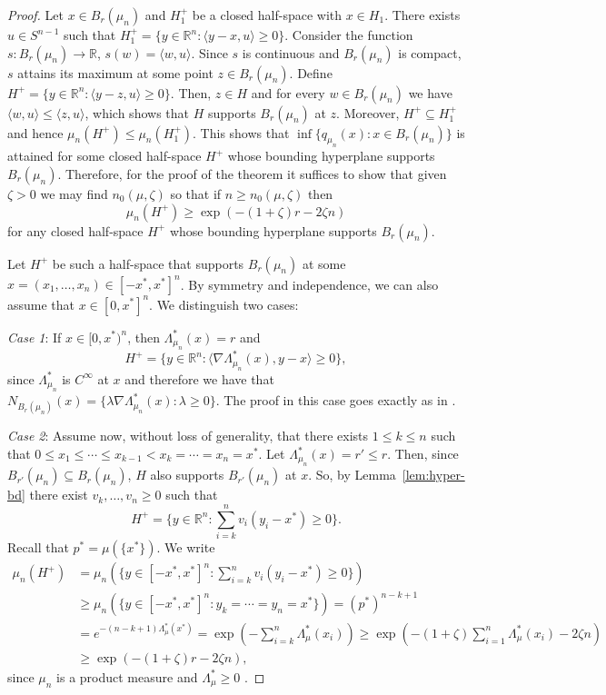 \documentclass[11pt,a4paper]{article} %
\theoremstyle{definition}
\theoremstyle{remark}
\newcommand{\1}{\mathds{1}}
\newcommand{\ls}{\le}
\newcommand{\gr}{\ge}
\begin{document}
\begin{proof}
Let $x\in B_r(\mu_n)$ and $H_1^+$ be a closed half-space with $x\in H_1$. There exists
$u\in {S^{n-1}}$ such that $H_1^+=\{y\in {\mathbb R}^n:\langle y-x,u\rangle\gr 0\}$. Consider
the function $s:B_r(\mu_n)\to {\mathbb R}$, $s(w)=\langle w, u\rangle$. Since $s$ is continuous and
$B_r(\mu_n)$ is compact, $s$ attains its maximum at some point $z\in B_r(\mu_n)$. Define
$H^+=\{y\in {\mathbb R}^n:\langle y-z,u\rangle\gr 0\}$. Then, $z\in H$ and
for every $w\in B_r(\mu_n)$ we have $\langle w,u\rangle\ls \langle z,u\rangle $, which shows that
$H$ supports $B_r(\mu_n)$ at $z$. Moreover, $H^+\subseteq H_1^+$ and hence
$\mu_n(H^+)\ls \mu_n (H_1^+)$. This shows that $\inf\{q_{\mu_n}(x):x\in B_r(\mu_n)\}$ is attained
for some closed half-space $H^+$ whose bounding hyperplane supports $B_r(\mu_n )$.
Therefore, for the proof of the theorem it suffices to show that given $\zeta >0$ we may find
$n_0(\mu,\zeta )$ so that if $n\gr n_0(\mu,\zeta)$ then
\begin{equation}\label{eq:main}\mu_n(H^+)\gr \exp (-(1+\zeta)r-2\zeta n)\end{equation}
for any closed half-space $H^+$ whose bounding hyperplane supports
$B_r(\mu_n )$.

Let $H^+$ be such a half-space that supports $B_r(\mu_n)$ at some $x=(x_1,\ldots,x_n) \in [-x^{\ast},x^{\ast}]^n$. By symmetry and independence, we can also assume that $x
\in [0,x^{\ast}]^n$. We distinguish two cases:

\noindent \textit{Case 1}: If $x \in [0,x^{\ast})^n$, then $\Lambda_{\mu_n}^{\ast}(x)=r $ and $$H^+=\{ y \in \mathbb{R}^n: \langle \nabla \Lambda_{\mu_n}^\ast(x), y-x \rangle \geq 0 \},$$ since $\Lambda_{\mu_n}^\ast$ is $C^{\infty}$ at $x$ and therefore we have that $N_{B_r(\mu_n )}(x)=\{ \lambda \nabla \Lambda_{\mu_n}^\ast(x): \lambda \geq 0 \}$. The proof in this case goes exactly as in \cite[Theorem 3.3]{Paf}.

\noindent \textit{Case 2}: Assume now, without loss of generality, that there exists $1 \leq k \leq n $ such that $0 \leq x_1 \leq \cdots \leq x_{k-1}<x_k=\cdots=x_n=x^\ast$. Let  $\Lambda_{\mu_n}^\ast(x)=r' \leq r$. Then, since $B_{r'}(\mu_n) \subseteq B_r(\mu_n)$, $H$ also supports $B_{r'}(\mu_n)$ at $x$. So, by Lemma~\ref{lem:hyper-bd} there exist $v_k,\ldots,v_n \geq 0$ such that $$H^+=\{y \in \mathbb{R}^n: \sum\limits_{i=k}^{n}v_i(y_i-x^\ast) \geq 0\}.$$ Recall that $p^\ast=\mu(\{x^\ast\})$. We write 
\begin{align*} \mu_n(H^+) &= \mu_n(\{y \in [-x^\ast,x^\ast]^n: \sum\limits_{i=k}^{n}v_i(y_i-x^\ast) \geq 0\}) 
    \\
    &\geq \mu_n(\{y \in [-x^\ast,x^\ast]^n: y_k=\cdots=y_n=x^\ast \})=(p^\ast)^{n-k+1}
    \\
    &=e^{-(n-k+1)\Lambda_{\mu}^\ast(x^\ast)}= \exp \left(- \sum\limits_{i=k}^{n} \Lambda_{\mu}^\ast(x_i) \right) \geq \exp \left(-(1+\zeta) \sum\limits_{i=1}^{n} \Lambda_{\mu}^\ast(x_i) -2 \zeta n \right)
    \\
    &\geq\exp(-(1+\zeta)r-2\zeta n),
\end{align*} since $\mu_n$ is a product measure and $\Lambda_{\mu}^\ast \geq 0$ .
\end{proof}
\end{document}
